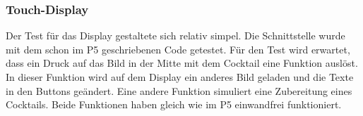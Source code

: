 \subsubsection{Touch-Display}
\label{subsubsec:Inbetriebnahme_Touch_Display}

Der Test für das Display gestaltete sich relativ simpel. Die Schnittstelle wurde mit dem schon im P5 geschriebenen Code getestet. Für den Test wird erwartet, dass ein Druck auf das Bild in der Mitte mit dem Cocktail eine Funktion auslöst. In dieser Funktion wird auf dem Display ein anderes Bild geladen und die Texte in den Buttons geändert. Eine andere Funktion simuliert eine Zubereitung eines Cocktails. Beide Funktionen haben gleich wie im P5 einwandfrei funktioniert.